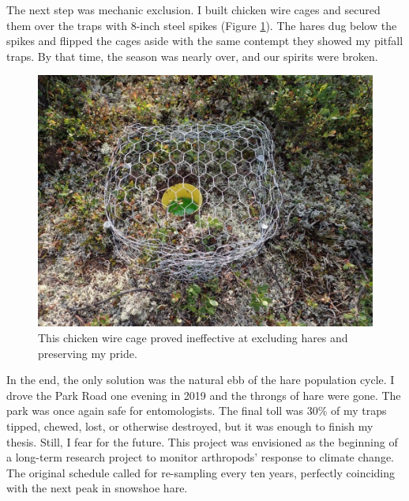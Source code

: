 The next step was mechanic exclusion. I built chicken wire cages and secured them over the traps with 8-inch steel spikes (Figure \ref{hare_cage}). The hares dug below the spikes and flipped the cages aside with the same contempt they showed my pitfall traps. By that time, the season was nearly over, and our spirits were broken.

\begin{figure}[H]
\begin{center}
\vspace{2mm}
\includegraphics[width=\textwidth]{img/hare_cage.jpg}
\caption{This chicken wire cage proved ineffective at excluding hares and preserving my pride.}
\label{hare_cage}
\end{center}
\end{figure} 

In the end, the only solution was the natural ebb of the hare population cycle. I drove the Park Road one evening in 2019 and the throngs of hare were gone. The park was once again safe for entomologists. The final toll was 30\% of my traps tipped, chewed, lost, or otherwise destroyed, but it was enough to finish my thesis. Still, I fear for the future. This project was envisioned as the beginning of a long-term research project to monitor arthropods’ response to climate change. The original schedule called for re-sampling every ten years, perfectly coinciding with the next peak in snowshoe hare.



